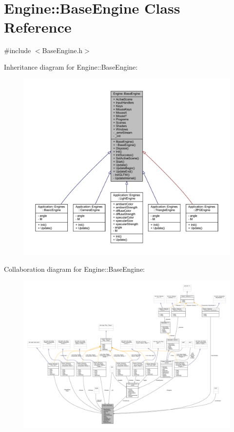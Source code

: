 \hypertarget{classEngine_1_1BaseEngine}{}\section{Engine\+:\+:Base\+Engine Class Reference}
\label{classEngine_1_1BaseEngine}


{\ttfamily \#include $<$Base\+Engine.\+h$>$}



Inheritance diagram for Engine\+:\+:Base\+Engine\+:
\nopagebreak
\begin{figure}[H]
\begin{center}
\leavevmode
\includegraphics[width=350pt]{classEngine_1_1BaseEngine__inherit__graph}
\end{center}
\end{figure}


Collaboration diagram for Engine\+:\+:Base\+Engine\+:
\nopagebreak
\begin{figure}[H]
\begin{center}
\leavevmode
\includegraphics[width=350pt]{classEngine_1_1BaseEngine__coll__graph}
\end{center}
\end{figure}
